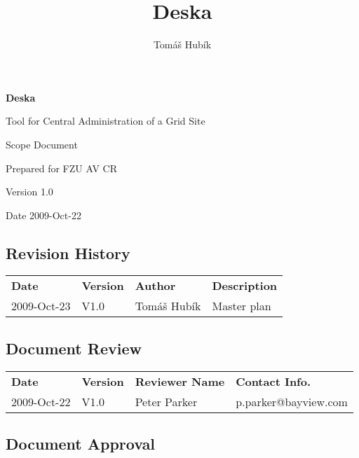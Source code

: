 \documentclass[12pt]{article}
\author{Tomáš Hubík}
\title{Deska}
\begin{document}
{\Huge \textbf{Deska}}

\vspace{0.2in}

{\large Tool for Central Administration of a Grid Site}

\vspace{0.5in}

{\large Scope Document}

\vspace{0.2in}

{\large Prepared for FZU AV CR}

\vspace{0.2in}

{\large Version 1.0}

\vspace{0.2in}

{\large Date 2009-Oct-22}

\vspace{0.5in}

\subsection*{Revision History}

\begin{table}[!h]
	\begin{tabular}{l l l l}
		\textbf{Date} & \textbf{Version} & \textbf{Author} & \textbf{Description} \\
		2009-Oct-23 & V1.0 & Tomáš Hubík & Master plan \\
	\end{tabular}
	\label{tab:RevisionHistory}
\end{table}


\subsection*{Document Review}

\begin{table}[!h]
	\begin{tabular}{l l l l}
		\textbf{Date} & \textbf{Version} & \textbf{Reviewer Name} & \textbf{Contact Info.} \\
		2009-Oct-22 & V1.0 & Peter Parker & p.parker@bayview.com \\
	\end{tabular}
	\label{tab:DocumentReview}
\end{table}


\subsection*{Document Approval}
\end{document}
